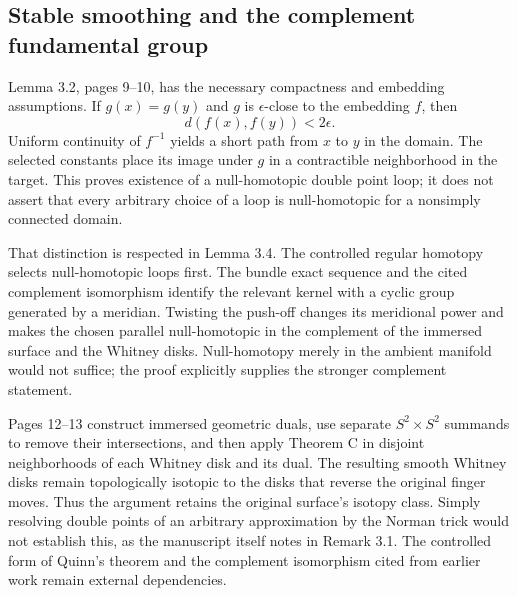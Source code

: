 \documentclass[10pt]{article}
\begin{document}
\subsection*{Stable smoothing and the complement fundamental group}
Lemma 3.2, pages 9–10, has the necessary compactness and embedding assumptions. If \(g(x)=g(y)\) and \(g\) is \(\epsilon\)-close to the embedding \(f\), then \[d(f(x),f(y))<2\epsilon.\] Uniform continuity of \(f^{-1}\) yields a short path from \(x\) to \(y\) in the domain. The selected constants place its image under \(g\) in a contractible neighborhood in the target. This proves existence of a null-homotopic double point loop; it does not assert that every arbitrary choice of a loop is null-homotopic for a nonsimply connected domain.\par
That distinction is respected in Lemma 3.4. The controlled regular homotopy selects null-homotopic loops first. The bundle exact sequence and the cited complement isomorphism identify the relevant kernel with a cyclic group generated by a meridian. Twisting the push-off changes its meridional power and makes the chosen parallel null-homotopic in the complement of the immersed surface and the Whitney disks. Null-homotopy merely in the ambient manifold would not suffice; the proof explicitly supplies the stronger complement statement.\par
Pages 12–13 construct immersed geometric duals, use separate \(S^2\times S^2\) summands to remove their intersections, and then apply Theorem C in disjoint neighborhoods of each Whitney disk and its dual. The resulting smooth Whitney disks remain topologically isotopic to the disks that reverse the original finger moves. Thus the argument retains the original surface’s isotopy class. Simply resolving double points of an arbitrary approximation by the Norman trick would not establish this, as the manuscript itself notes in Remark 3.1. The controlled form of Quinn’s theorem and the complement isomorphism cited from earlier work remain external dependencies.\par
\end{document}
